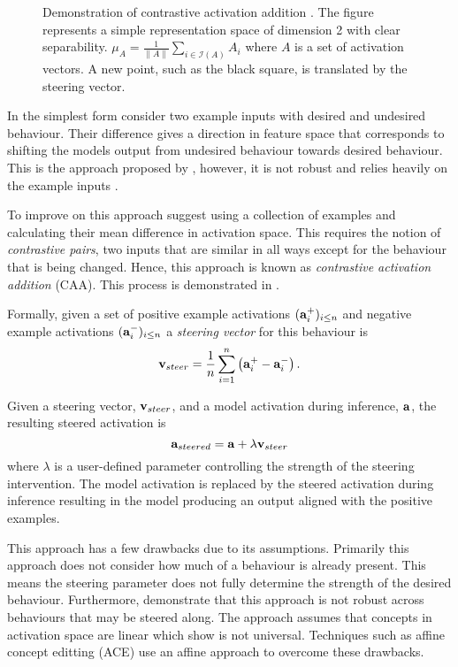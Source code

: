 \begin{figure}
    \centering
    \captionsetup{width=.9\textwidth}
    
\caption{Demonstration of contrastive activation addition \citep{caa}. The figure represents a simple representation space of dimension 2 with clear separability. $\mu_A = \frac{1}{\|A\|}\sum_{i \in \mathcal{I}(A)} A_i$ where $A$ is a set of activation vectors. A new point, such as the black square, is translated by the steering vector.}
    \label{fig:caa}
\end{figure}

In the simplest form consider two example inputs with desired and undesired behaviour.
Their difference gives a direction in feature space that corresponds to shifting the models output from undesired behaviour towards desired behaviour.
This is the approach proposed by \citet{activation-addition}, however, it is not robust and relies heavily on the example inputs \citep{caa}.

To improve on this approach \citet{caa} suggest using a collection of examples and calculating their mean difference in activation space.
This requires the notion of \textit{contrastive pairs}, two inputs that are similar in all ways except for the behaviour that is being changed.
Hence, this approach is known as \textit{contrastive activation addition} (CAA).
This process is demonstrated in .

Formally, given a set of positive example activations $(\mathbf{a}_i^+)_{i\le n}$ and negative example activations $(\mathbf{a}_i^-)_{i\le n}$ a \textit{steering vector} for this behaviour is
\[\mathbf{v}_{steer} = \frac{1}{n}\sum_{i=1}^{n}\left(\mathbf{a}_i^+ - \mathbf{a}_i^-\right).\]

Given a steering vector, $\mathbf{v}_{steer}$, and a model activation during inference, $\mathbf{a}$, the resulting steered activation is
\begin{equation}
    \label{eq:caa}
    \mathbf{a}_{steered} = \mathbf{a} + \lambda\mathbf{v}_{steer}
\end{equation}
where $\lambda$ is a user-defined parameter controlling the strength of the steering intervention.
The model activation is replaced by the steered activation during inference resulting in the model producing an output aligned with the positive examples.

This approach has a few drawbacks \citep{steerability, ace, non-linear-features} due to its assumptions.
Primarily this approach does not consider how much of a behaviour is already present.
This means the steering parameter does not fully determine the strength of the desired behaviour.
Furthermore, \citet{steerability} demonstrate that this approach is not robust across behaviours that may be steered along.
The approach assumes that concepts in activation space are linear which \citet{non-linear-features} show is not universal.
Techniques such as affine concept editting (ACE)  use an affine approach to overcome these drawbacks.

